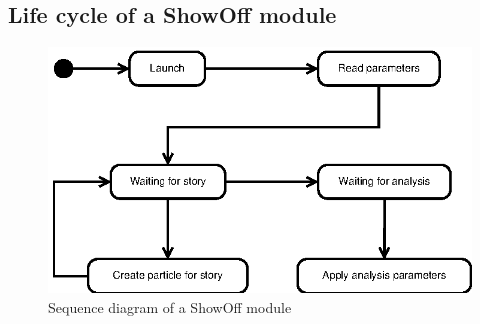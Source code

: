 \subsection{Life cycle of a ShowOff module}

\begin{figure}[htp]
  \centering
  \includegraphics{image/sequence-diagram-showoff}
  \caption{Sequence diagram of a ShowOff module}
\end{figure}
